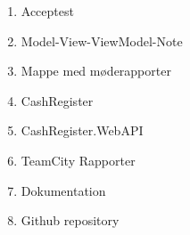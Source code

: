 \begin{enumerate}
	\item Acceptest
	\item Model-View-ViewModel-Note
	\item Mappe med møderapporter
	\item CashRegister
	\item CashRegister.WebAPI
	\item TeamCity Rapporter
	\item Dokumentation
	\item Github repository
\end{enumerate}